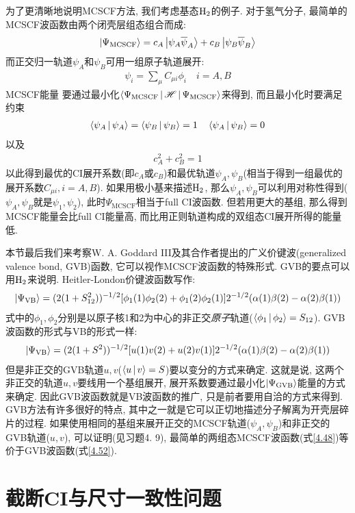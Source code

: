 为了更清晰地说明MCSCF方法, 
我们考虑基态$\mathrm{H}_2$的例子. 
对于氢气分子, 
最简单的MCSCF波函数由两个闭壳层组态组合而成:
\begin{align}
\Ket{\Psi_\mathrm{MCSCF}} = c_A\Ket{\psi_A\overline{\psi}_A} + c_B\Ket{\psi_B\overline{\psi}_B} 
\end{align}
而正交归一轨道$\psi_A$和$\psi_B$可用一组原子轨道展开:
\begin{align}
\psi_i=\sum_\mu C_{\mu i}\phi_i\quad i=A,B
\end{align}
MCSCF能量 要通过最小化$\Braket{\Psi_\mathrm{MCSCF}|\mathscr{H}|\Psi_\mathrm{MCSCF}}$来得到, 而且最小化时要满足约束
\begin{align}
\Braket{\psi_A|\psi_A} = \Braket{\psi_B|\psi_B}=1\quad \Braket{\psi_A|\psi_B}=0
\end{align}
以及
\begin{align}
c_A^2 + c_B^2 = 1
\end{align}
以此得到最优的CI展开系数(即$c_A$或$c_B$)和最优轨道$\psi_A,\psi_B$(相当于得到一组最优的展开系数$C_{\mu i}, i=A,B$). 
如果用极小基来描述$\mathrm{H}_2$, 
那么$\psi_A,\psi_B$可以利用对称性得到($\psi_A,\psi_B$就是$\psi_1,\psi_2$), 
此时$\Psi_\mathrm{MCSCF}$相当于full CI波函数. 
但若用更大的基组, 
那么得到MCSCF能量会比full CI能量高, 
而比用\hft 正则轨道构成的双组态CI展开所得的能量低.


本节最后我们来考察W. 
A. 
Goddard III及其合作者提出的广义价键波(generalized valence bond, 
GVB)函数, 
它可以视作MCSCF波函数的特殊形式. 
GVB的要点可以用$\mathrm{H}_2$来说明. 
Heitler-London价键波函数写作:
\begin{align}
\Ket{\Psi_\mathrm{VB}} = (2(1+S_{12}^2))^{-1/2} [\phi_1(1)\phi_2(2) + \phi_1(2)\phi_2(1)]2^{-1/2}(\alpha(1)\beta(2)-\alpha(2)\beta(1))
\end{align}
式中的$\phi_1,\phi_2$分别是以原子核1和2为中心的非正交\emph{原子}轨道($\Braket{\phi_1|\phi_2}=S_{12}$). 
GVB波函数的形式与VB的形式一样:
\begin{align}
	\Ket{\Psi_\mathrm{VB}} = (2(1+S^2))^{-1/2} [u(1)v(2) + u(2)v(1)]2^{-1/2}(\alpha(1)\beta(2)-\alpha(2)\beta(1))
\end{align}
但是非正交的GVB轨道$u,v$($\Braket{u|v}=S$)要以变分的方式来确定. 
这就是说, 
这两个非正交的轨道$u,v$要线用一个基组展开, 
展开系数要通过最小化$\Ket{\Psi_\mathrm{GVB}}$能量的方式来确定. 
因此GVB波函数就是VB波函数的推广, 
只是前者要用自洽的方式来得到. 
GVB方法有许多很好的特点, 
其中之一就是它可以正切地描述分子解离为开壳层碎片的过程. 
如果使用相同的基组来展开正交的MCSCF轨道($\psi_A,\psi_B$)和非正交的GVB轨道($u,v$), 
可以证明(见习题4.
9), 
最简单的两组态MCSCF波函数(式\eqref{4.48})等价于GVB波函数(式\eqref{4.52}).





\section{截断CI与尺寸一致性问题}
\label{sec4.6}
\theendnotes